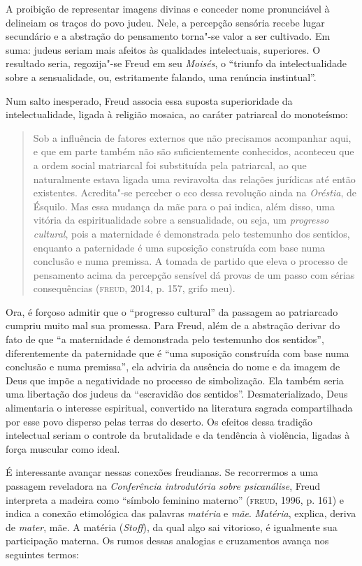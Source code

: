A proibição de representar imagens divinas e conceder nome pronunciável
à  delineiam os traços do povo judeu. Nele, a percepção sensória
recebe lugar secundário e a abstração do pensamento torna"-se valor a ser
cultivado. Em suma: judeus seriam mais afeitos às qualidades
intelectuais, superiores. O resultado seria, regozija"-se Freud em seu
\emph{Moisés}, o ``triunfo da intelectualidade sobre a sensualidade, ou,
estritamente falando, uma renúncia instintual''.

Num salto inesperado, Freud associa essa suposta superioridade da
intelectualidade, ligada à religião mosaica, ao caráter patriarcal do
monoteísmo:

\begin{quote}
Sob a influência de fatores externos que não precisamos acompanhar aqui,
e que em parte também não são suficientemente conhecidos, aconteceu que
a ordem social matriarcal foi substituída pela patriarcal, ao que
naturalmente estava ligada uma reviravolta das relações jurídicas até
então existentes. Acredita"-se perceber o eco dessa revolução ainda na
\emph{Oréstia}, de Ésquilo. Mas essa mudança da mãe para o pai indica,
além disso, uma vitória da espiritualidade sobre a sensualidade, ou
seja, um \emph{progresso cultural}, pois a maternidade é demonstrada
pelo testemunho dos sentidos, enquanto a paternidade é uma suposição
construída com base numa conclusão e numa premissa. A tomada de partido
que eleva o processo de pensamento acima da percepção sensível dá provas
de um passo com sérias consequências (\textsc{freud}, 2014, p. 157, grifo
meu).
\end{quote}

Ora, é forçoso admitir que o ``progresso cultural'' da passagem ao
patriarcado cumpriu muito mal sua promessa. Para Freud, além de a
abstração derivar do fato de que ``a maternidade é demonstrada pelo
testemunho dos sentidos'', diferentemente da paternidade que é ``uma
suposição construída com base numa conclusão e numa premissa'', ela
adviria da ausência do nome e da imagem de Deus que impõe a negatividade
no processo de simbolização. Ela também seria uma libertação dos judeus
da ``escravidão dos sentidos''. Desmaterializado, Deus alimentaria o
interesse espiritual, convertido na literatura sagrada compartilhada por
esse povo disperso pelas terras do deserto. Os efeitos dessa tradição
intelectual seriam o controle da brutalidade e da tendência à violência,
ligadas à força muscular como ideal.

É interessante avançar nessas conexões freudianas. Se recorrermos a uma
passagem reveladora na \emph{ Conferência introdutória sobre
psicanálise}, Freud interpreta a madeira como ``símbolo feminino
materno'' (\textsc{freud}, 1996, p. 161) e indica a conexão etimológica das
palavras \emph{matéria} e \emph{mãe}. \emph{Matéria}, explica, deriva de
\emph{mater}, mãe. A matéria (\emph{Stoff}), da qual algo sai vitorioso,
é igualmente sua participação materna. Os rumos dessas analogias e
cruzamentos avança nos seguintes termos:


